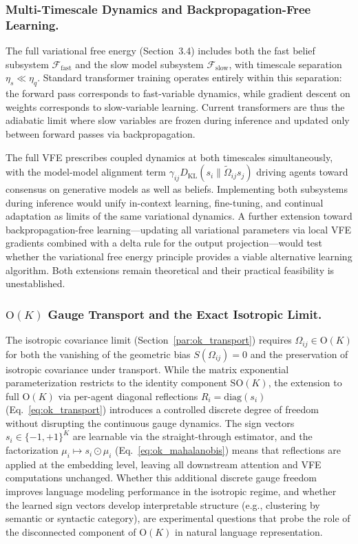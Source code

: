 \documentclass[twoside,11pt]{article}
\begin{document}
\subsubsection{Multi-Timescale Dynamics and Backpropagation-Free Learning.}

The full variational free energy (Section~3.4) includes both the fast belief subsystem $\mathcal{F}_{\text{fast}}$ and the slow model subsystem $\mathcal{F}_{\text{slow}}$, with timescale separation $\eta_s \ll \eta_q$. Standard transformer training operates entirely within this separation: the forward pass corresponds to fast-variable dynamics, while gradient descent on weights corresponds to slow-variable learning. Current transformers are thus the adiabatic limit where slow variables are frozen during inference and updated only between forward passes via backpropagation.

The full VFE prescribes coupled dynamics at both timescales simultaneously, with the model-model alignment term $\gamma_{ij} D_{\mathrm{KL}}(s_i \| \tilde{\Omega}_{ij} s_j)$ driving agents toward consensus on generative models as well as beliefs. Implementing both subsystems during inference would unify in-context learning, fine-tuning, and continual adaptation as limits of the same variational dynamics. A further extension toward backpropagation-free learning---updating all variational parameters via local VFE gradients combined with a delta rule for the output projection---would test whether the variational free energy principle provides a viable alternative learning algorithm. Both extensions remain theoretical and their practical feasibility is unestablished.

\subsubsection{$\mathrm{O}(K)$ Gauge Transport and the Exact Isotropic Limit.}

The isotropic covariance limit (Section~\ref{par:ok_transport}) requires $\Omega_{ij} \in \mathrm{O}(K)$ for both the vanishing of the geometric bias $S(\Omega_{ij}) = 0$ and the preservation of isotropic covariance under transport.  While the matrix exponential parameterization restricts to the identity component $\mathrm{SO}(K)$, the extension to full $\mathrm{O}(K)$ via per-agent diagonal reflections $R_i = \mathrm{diag}(s_i)$ (Eq.~\ref{eq:ok_transport}) introduces a controlled discrete degree of freedom without disrupting the continuous gauge dynamics.  The sign vectors $s_i \in \{-1,+1\}^K$ are learnable via the straight-through estimator, and the factorization $\mu_i \mapsto s_i \odot \mu_i$ (Eq.~\ref{eq:ok_mahalanobis}) means that reflections are applied at the embedding level, leaving all downstream attention and VFE computations unchanged.  Whether this additional discrete gauge freedom improves language modeling performance in the isotropic regime, and whether the learned sign vectors develop interpretable structure (e.g., clustering by semantic or syntactic category), are experimental questions that probe the role of the disconnected component of $\mathrm{O}(K)$ in natural language representation.
\end{document}
